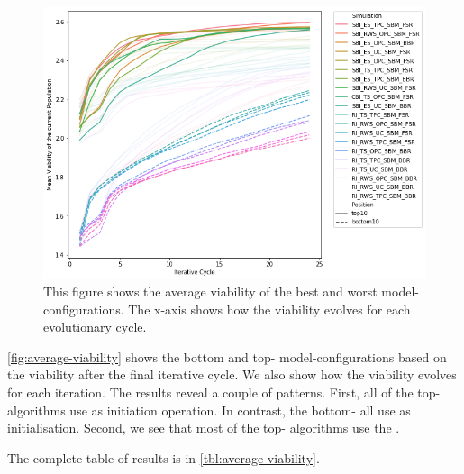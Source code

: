 \documentclass[./../../paper.tex]{subfiles}
\begin{document}
\begin{figure}[htbp]
    \centering
    \includegraphics[width=\textwidth]{figures/generated/exp1_effect_on_viability_top10_last10.png}
    \caption{This figure shows the average viability of the  best and worst model-configurations. The x-axis shows how the viability evolves for each evolutionary cycle.}
    \label{fig:average-viability}
\end{figure}

\noindent \autoref{fig:average-viability} shows the bottom and top- model-configurations based on the viability after the final iterative cycle. We also show how the viability evolves for each iteration. The results reveal a couple of patterns. 
First, all of the top- algorithms use  as initiation operation. In contrast, the bottom- all use  as initialisation. 
Second, we see that most of the top- algorithms use the . 

The complete table of results is in \autoref{tbl:average-viability}.

\end{document}
